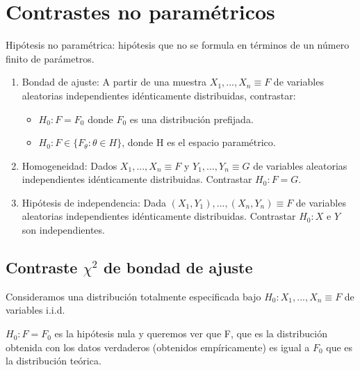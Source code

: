 \section{Contrastes no paramétricos}

Hipótesis no paramétrica: hipótesis que no se formula en términos de un número finito de parámetros.

\begin{enumerate}
\item Bondad de ajuste: A partir de una muestra $X_1,...,X_n \equiv F$ de variables aleatorias independientes idénticamente distribuidas, contrastar:
\begin{itemize}
\item $H_0: F=F_0$ donde $F_0$ es una distribución prefijada.
\item $H_0: F \in \{F_{\theta} : {\theta}\in H\}$, donde H es el espacio paramétrico.
\end{itemize}
\item Homogeneidad: Dados $X_1,...,X_n \equiv F$ y $Y_1,...,Y_n \equiv G$ de variables aleatorias independientes idénticamente distribuidas. Contrastar $H_0: F=G$.
\item Hipótesis de independencia: Dada $(X_1,Y_1),...,(X_n,Y_n) \equiv F$ de variables aleatorias independientes idénticamente distribuidas. Contrastar $H_0: X$ e $Y$ son independientes.
\end{enumerate}

\subsection{Contraste $\chi^2$ de bondad de ajuste}
Consideramos una distribución totalmente especificada bajo $H_0: X_1,...,X_n \equiv F$ de variables i.i.d.

$H_0: F=F_0$ es la hipótesis nula y queremos ver que F, que es la distribución obtenida con los datos verdaderos (obtenidos empíricamente) es igual a $F_0$ que es la distribución teórica.

